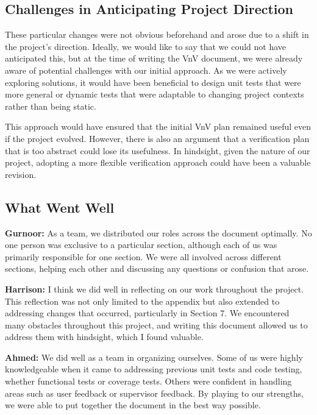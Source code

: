 \documentclass[12pt, titlepage]{article}
\begin{document}
\begin{enumerate}
  \subsection{Challenges in Anticipating Project Direction}
  
  These particular changes were not obvious beforehand and arose due to a shift in the project's direction. Ideally, we would like to say that we could not have anticipated this, but at the time of writing the VnV document, we were already aware of potential challenges with our initial approach. As we were actively exploring solutions, it would have been beneficial to design unit tests that were more general or dynamic tests that were adaptable to changing project contexts rather than being static. 
  
  This approach would have ensured that the initial VnV plan remained useful even if the project evolved. However, there is also an argument that a verification plan that is too abstract could lose its usefulness. In hindsight, given the nature of our project, adopting a more flexible verification approach could have been a valuable revision.
  
  \subsection{What Went Well}
  
  \textbf{Gurnoor:} As a team, we distributed our roles across the document optimally. No one person was exclusive to a particular section, although each of us was primarily responsible for one section. We were all involved across different sections, helping each other and discussing any questions or confusion that arose.
  
  \textbf{Harrison:} I think we did well in reflecting on our work throughout the project. This reflection was not only limited to the appendix but also extended to addressing changes that occurred, particularly in Section 7. We encountered many obstacles throughout this project, and writing this document allowed us to address them with hindsight, which I found valuable.
  
  \textbf{Ahmed:} We did well as a team in organizing ourselves. Some of us were highly knowledgeable when it came to addressing previous unit tests and code testing, whether functional tests or coverage tests. Others were confident in handling areas such as user feedback or supervisor feedback. By playing to our strengths, we were able to put together the document in the best way possible.
  

\end{enumerate}
\end{document}
